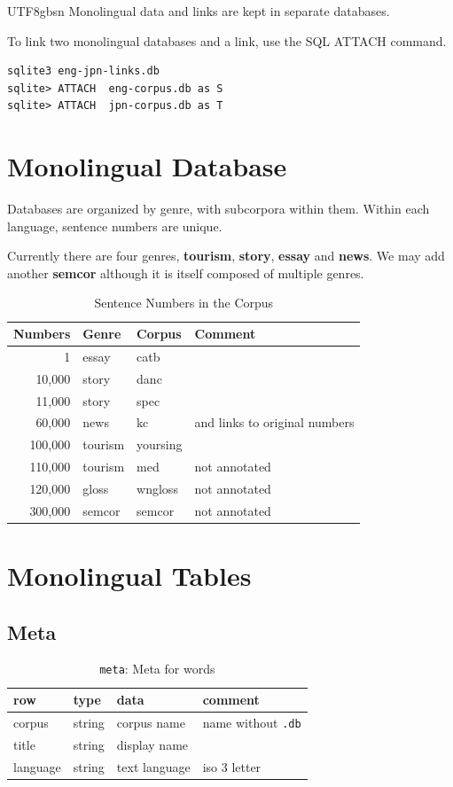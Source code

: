 \documentclass[12pt]{book} %
\newcommand{\txx}[1]{\textbf{#1}}
\begin{document}
\begin{CJK}{UTF8}{gbsn}
Monolingual data and links are kept in separate databases.

To link two monolingual databases and a link, use the SQL ATTACH command.
\begin{verbatim}
sqlite3 eng-jpn-links.db
sqlite> ATTACH  eng-corpus.db as S
sqlite> ATTACH  jpn-corpus.db as T
\end{verbatim}




\section{Monolingual Database}


Databases are organized by genre, with subcorpora within them.  Within
each language, sentence numbers are unique.

Currently there are four genres, \txx{tourism}, \txx{story},
\txx{essay} and \txx{news}.  We may add another \txx{semcor} although
it is itself composed of multiple genres.

\begin{table}
  \centering
\begin{tabular}{rlll}
  Numbers & Genre & Corpus & Comment \\
  \hline
  1      & essay & catb &  \\
  10,000 & story & danc &  \\
  11,000 & story & spec &  \\
  60,000 & news & kc & and links to original numbers \\
  100,000 & tourism & yoursing &  \\
  110,000 & tourism & med & not annotated \\
  120,000 & gloss & wngloss & not annotated  \\
  300,000 & semcor & semcor & not annotated  
\end{tabular}

  \caption{Sentence Numbers in the Corpus}
\end{table}

\section{Monolingual Tables}

\subsection{Meta}

\begin{table}[htpb]
  \centering
  \begin{tabular}{llll}
  \textbf{row}   &  \textbf{type} & \textbf{data} & \textbf{comment} \\
  \hline
  corpus & string & corpus name & name without \texttt{.db}\\
  title & string & display name & \\
  language & string & text language & iso 3 letter  \\
\hline
\end{tabular}
\caption{\texttt{meta}: Meta for words}
\end{table}


\end{CJK}
\end{document}
